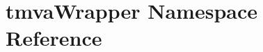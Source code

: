 \hypertarget{namespacetmvaWrapper}{
\section{tmvaWrapper Namespace Reference}
\label{namespacetmvaWrapper}
}
